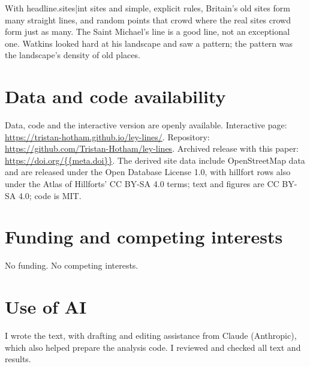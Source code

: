 \documentclass[11pt,a4paper]{article}
\begin{document}
With {{headline.sites|int}} sites and simple, explicit rules, Britain's old sites form many straight lines, and random points that crowd where the real sites crowd form just as many. The Saint Michael's line is a good line, not an exceptional one. Watkins looked hard at his landscape and saw a pattern; the pattern was the landscape's density of old places.

\section*{Data and code availability}

Data, code and the interactive version are openly available. Interactive page: \url{https://tristan-hotham.github.io/ley-lines/}. Repository: \url{https://github.com/Tristan-Hotham/ley-lines}. Archived release with this paper: \url{https://doi.org/{{meta.doi}}}. The derived site data include OpenStreetMap data and are released under the Open Database License 1.0, with hillfort rows also under the Atlas of Hillforts' CC BY-SA 4.0 terms; text and figures are CC BY-SA 4.0; code is MIT.

\section*{Funding and competing interests}

No funding. No competing interests.

\section*{Use of AI}

I wrote the text, with drafting and editing assistance from Claude (Anthropic), which also helped prepare the analysis code. I reviewed and checked all text and results.
\end{document}
